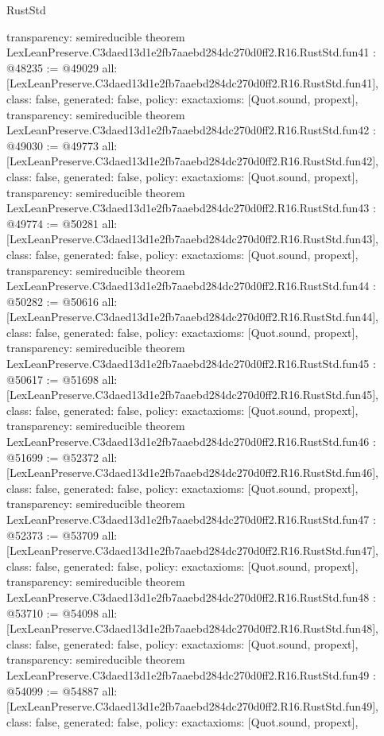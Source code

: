\begin{lexlean}{RustStd}
\begin{coremodule}
{  transparency: semireducible
}
theorem LexLeanPreserve.C3daed13d1e2fb7aaebd284dc270d0ff2.R16.RustStd.fun41 : @48235 := @49029 {
  all: [LexLeanPreserve.C3daed13d1e2fb7aaebd284dc270d0ff2.R16.RustStd.fun41],
  class: false,
  generated: false,
  policy: exact{axioms: [Quot.sound, propext]},
  transparency: semireducible
}
theorem LexLeanPreserve.C3daed13d1e2fb7aaebd284dc270d0ff2.R16.RustStd.fun42 : @49030 := @49773 {
  all: [LexLeanPreserve.C3daed13d1e2fb7aaebd284dc270d0ff2.R16.RustStd.fun42],
  class: false,
  generated: false,
  policy: exact{axioms: [Quot.sound, propext]},
  transparency: semireducible
}
theorem LexLeanPreserve.C3daed13d1e2fb7aaebd284dc270d0ff2.R16.RustStd.fun43 : @49774 := @50281 {
  all: [LexLeanPreserve.C3daed13d1e2fb7aaebd284dc270d0ff2.R16.RustStd.fun43],
  class: false,
  generated: false,
  policy: exact{axioms: [Quot.sound, propext]},
  transparency: semireducible
}
theorem LexLeanPreserve.C3daed13d1e2fb7aaebd284dc270d0ff2.R16.RustStd.fun44 : @50282 := @50616 {
  all: [LexLeanPreserve.C3daed13d1e2fb7aaebd284dc270d0ff2.R16.RustStd.fun44],
  class: false,
  generated: false,
  policy: exact{axioms: [Quot.sound, propext]},
  transparency: semireducible
}
theorem LexLeanPreserve.C3daed13d1e2fb7aaebd284dc270d0ff2.R16.RustStd.fun45 : @50617 := @51698 {
  all: [LexLeanPreserve.C3daed13d1e2fb7aaebd284dc270d0ff2.R16.RustStd.fun45],
  class: false,
  generated: false,
  policy: exact{axioms: [Quot.sound, propext]},
  transparency: semireducible
}
theorem LexLeanPreserve.C3daed13d1e2fb7aaebd284dc270d0ff2.R16.RustStd.fun46 : @51699 := @52372 {
  all: [LexLeanPreserve.C3daed13d1e2fb7aaebd284dc270d0ff2.R16.RustStd.fun46],
  class: false,
  generated: false,
  policy: exact{axioms: [Quot.sound, propext]},
  transparency: semireducible
}
theorem LexLeanPreserve.C3daed13d1e2fb7aaebd284dc270d0ff2.R16.RustStd.fun47 : @52373 := @53709 {
  all: [LexLeanPreserve.C3daed13d1e2fb7aaebd284dc270d0ff2.R16.RustStd.fun47],
  class: false,
  generated: false,
  policy: exact{axioms: [Quot.sound, propext]},
  transparency: semireducible
}
theorem LexLeanPreserve.C3daed13d1e2fb7aaebd284dc270d0ff2.R16.RustStd.fun48 : @53710 := @54098 {
  all: [LexLeanPreserve.C3daed13d1e2fb7aaebd284dc270d0ff2.R16.RustStd.fun48],
  class: false,
  generated: false,
  policy: exact{axioms: [Quot.sound, propext]},
  transparency: semireducible
}
theorem LexLeanPreserve.C3daed13d1e2fb7aaebd284dc270d0ff2.R16.RustStd.fun49 : @54099 := @54887 {
  all: [LexLeanPreserve.C3daed13d1e2fb7aaebd284dc270d0ff2.R16.RustStd.fun49],
  class: false,
  generated: false,
  policy: exact{axioms: [Quot.sound, propext]},
}
\end{coremodule}
\end{lexlean}
